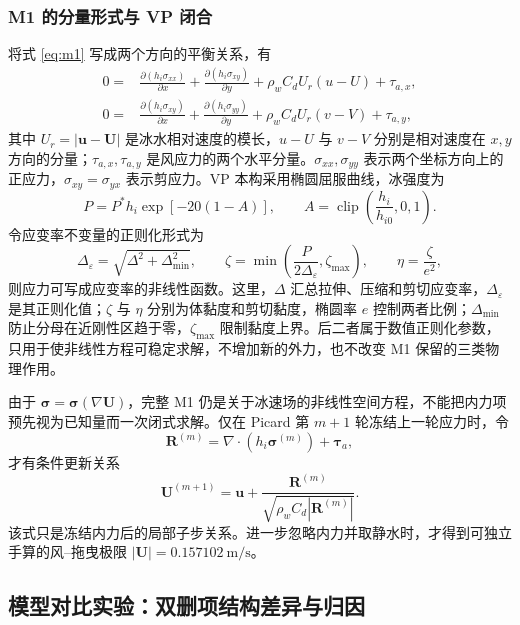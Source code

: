 \documentclass[UTF8,fontset=none]{ctexart}
\newcommand{\vect}[1]{\boldsymbol{#1}}
\begin{document}
\subsubsection{M1 的分量形式与 VP 闭合}

将式 \eqref{eq:m1} 写成两个方向的平衡关系，有
\begin{align}
0={}&\frac{\partial(h_i\sigma_{xx})}{\partial x}
+\frac{\partial(h_i\sigma_{xy})}{\partial y}
+\rho_wC_dU_r(u-U)+\tau_{a,x},\\
0={}&\frac{\partial(h_i\sigma_{xy})}{\partial x}
+\frac{\partial(h_i\sigma_{yy})}{\partial y}
+\rho_wC_dU_r(v-V)+\tau_{a,y},
\end{align}
其中 $U_r=|\vect u-\vect U|$ 是冰水相对速度的模长，$u-U$ 与 $v-V$ 分别是相对速度在 $x,y$ 方向的分量；$\tau_{a,x},\tau_{a,y}$ 是风应力的两个水平分量。$\sigma_{xx},\sigma_{yy}$ 表示两个坐标方向上的正应力，$\sigma_{xy}=\sigma_{yx}$ 表示剪应力。VP 本构采用椭圆屈服曲线，冰强度为
\begin{equation}
P=P^*h_i\exp[-20(1-A)],
\qquad
A=\operatorname{clip}\left(\frac{h_i}{h_{i0}},0,1\right).
\end{equation}
令应变率不变量的正则化形式为
\begin{equation}
\Delta_\varepsilon=\sqrt{\Delta^2+\Delta_{\min}^2},
\qquad
\zeta=\min\left(\frac{P}{2\Delta_\varepsilon},\zeta_{\max}\right),
\qquad
\eta=\frac{\zeta}{e^2},
\end{equation}
则应力可写成应变率的非线性函数。这里，$\Delta$ 汇总拉伸、压缩和剪切应变率，$\Delta_\varepsilon$ 是其正则化值；$\zeta$ 与 $\eta$ 分别为体黏度和剪切黏度，椭圆率 $e$ 控制两者比例；$\Delta_{\min}$ 防止分母在近刚性区趋于零，$\zeta_{\max}$ 限制黏度上界。后二者属于数值正则化参数，只用于使非线性方程可稳定求解，不增加新的外力，也不改变 M1 保留的三类物理作用。

由于 $\vect\sigma=\vect\sigma(\nabla\vect U)$，完整 M1 仍是关于冰速场的非线性空间方程，不能把内力项预先视为已知量而一次闭式求解。仅在 Picard 第 $m+1$ 轮冻结上一轮应力时，令
\begin{equation}
\vect R^{(m)}=\nabla\cdot(h_i\vect\sigma^{(m)})+\vect\tau_a,
\end{equation}
才有条件更新关系
\begin{equation}
\vect U^{(m+1)}
=\vect u+\frac{\vect R^{(m)}}{\sqrt{\rho_wC_d|\vect R^{(m)}|}}.
\end{equation}
该式只是冻结内力后的局部子步关系。进一步忽略内力并取静水时，才得到可独立手算的风--拖曳极限 $|\vect U|=0.157102\ \mathrm{m/s}$。

\subsection{模型对比实验：双删项结构差异与归因}
\end{document}
